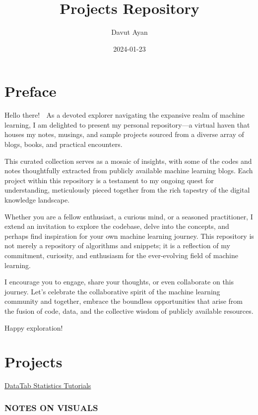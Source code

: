 \documentclass[
]{book}
\title{Projects Repository}
\author{Davut Ayan}
\date{2024-01-23}
\begin{document}
\maketitle

{
\setcounter{tocdepth}{1}
\tableofcontents
}
\hypertarget{preface}{%
\chapter*{Preface}\label{preface}}

Hello there! 👋 As a devoted explorer navigating the expansive realm of machine learning, I am delighted to present my personal repository---a virtual haven that houses my notes, musings, and sample projects sourced from a diverse array of blogs, books, and practical encounters.

This curated collection serves as a mosaic of insights, with some of the codes and notes thoughtfully extracted from publicly available machine learning blogs. Each project within this repository is a testament to my ongoing quest for understanding, meticulously pieced together from the rich tapestry of the digital knowledge landscape.

Whether you are a fellow enthusiast, a curious mind, or a seasoned practitioner, I extend an invitation to explore the codebase, delve into the concepts, and perhaps find inspiration for your own machine learning journey. This repository is not merely a repository of algorithms and snippets; it is a reflection of my commitment, curiosity, and enthusiasm for the ever-evolving field of machine learning.

I encourage you to engage, share your thoughts, or even collaborate on this journey. Let's celebrate the collaborative spirit of the machine learning community and together, embrace the boundless opportunities that arise from the fusion of code, data, and the collective wisdom of publicly available resources.

Happy exploration!

\hypertarget{projects}{%
\chapter{Projects}\label{projects}}

\href{https://datatab.net/tutorial/get-started}{DataTab Statistics Tutorials}

\hypertarget{notes-on-visuals}{%
\subsection{NOTES ON VISUALS}\label{notes-on-visuals}}
\end{document}
